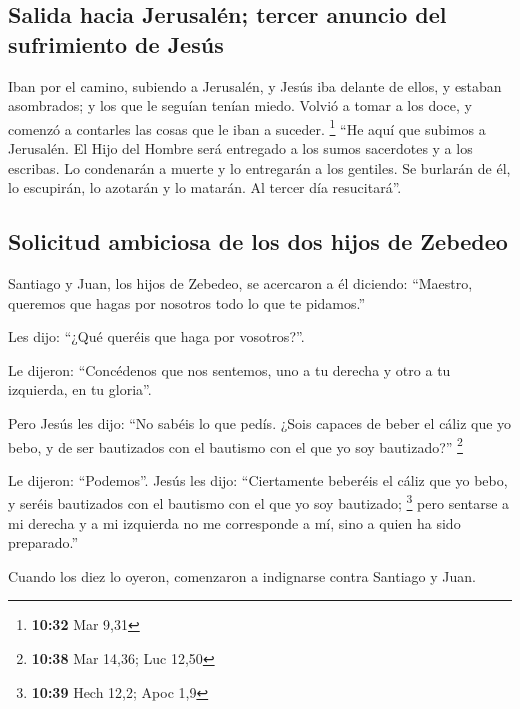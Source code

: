 \hypertarget{salida-hacia-jerusaluxe9n-tercer-anuncio-del-sufrimiento-de-jesuxfas}{%
\subsection{Salida hacia Jerusalén; tercer anuncio del sufrimiento de
Jesús}\label{salida-hacia-jerusaluxe9n-tercer-anuncio-del-sufrimiento-de-jesuxfas}}

 Iban por el camino, subiendo a Jerusalén, y Jesús iba
delante de ellos, y estaban asombrados; y los que le seguían tenían
miedo. Volvió a tomar a los doce, y comenzó a contarles las cosas que le
iban a suceder. \footnote{\textbf{10:32} Mar 9,31}  ``He
aquí que subimos a Jerusalén. El Hijo del Hombre será entregado a los
sumos sacerdotes y a los escribas. Lo condenarán a muerte y lo
entregarán a los gentiles.  Se burlarán de él, lo
escupirán, lo azotarán y lo matarán. Al tercer día resucitará''.

\hypertarget{solicitud-ambiciosa-de-los-dos-hijos-de-zebedeo}{%
\subsection{Solicitud ambiciosa de los dos hijos de
Zebedeo}\label{solicitud-ambiciosa-de-los-dos-hijos-de-zebedeo}}

 Santiago y Juan, los hijos de Zebedeo, se acercaron a él
diciendo: ``Maestro, queremos que hagas por nosotros todo lo que te
pidamos.''

 Les dijo: ``¿Qué queréis que haga por vosotros?''.

 Le dijeron: ``Concédenos que nos sentemos, uno a tu
derecha y otro a tu izquierda, en tu gloria''.

 Pero Jesús les dijo: ``No sabéis lo que pedís. ¿Sois
capaces de beber el cáliz que yo bebo, y de ser bautizados con el
bautismo con el que yo soy bautizado?'' \footnote{\textbf{10:38} Mar
  14,36; Luc 12,50}

 Le dijeron: ``Podemos''. Jesús les dijo: ``Ciertamente
beberéis el cáliz que yo bebo, y seréis bautizados con el bautismo con
el que yo soy bautizado; \footnote{\textbf{10:39} Hech 12,2; Apoc 1,9}
 pero sentarse a mi derecha y a mi izquierda no me
corresponde a mí, sino a quien ha sido preparado.''

 Cuando los diez lo oyeron, comenzaron a indignarse
contra Santiago y Juan.

